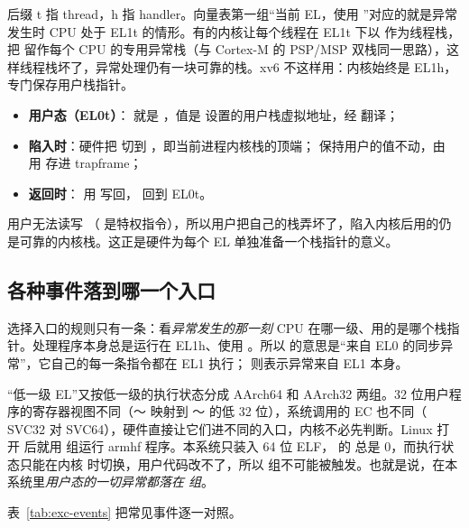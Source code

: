 后缀 t 指 thread，h 指 handler。向量表第一组“当前 EL，使用 ”对应的就是异常发生时 CPU 处于 EL1t 的情形。有的内核让每个线程在 EL1t 下以  作为线程栈，把  留作每个 CPU 的专用异常栈（与 Cortex-M 的 PSP/MSP 双栈同一思路），这样线程栈坏了，异常处理仍有一块可靠的栈。xv6 不这样用：内核始终是 EL1h， 专门保存用户栈指针。

\begin{itemize}
  \item \textbf{用户态（EL0t）}： 就是 ，值是  设置的用户栈虚拟地址，经  翻译；
  \item \textbf{陷入时}：硬件把  切到 ，即当前进程内核栈的顶端； 保持用户的值不动，由  用  存进 trapframe；
  \item \textbf{返回时}： 用  写回， 回到 EL0t。
\end{itemize}

用户无法读写 （ 是特权指令），所以用户把自己的栈弄坏了，陷入内核后用的仍是可靠的内核栈。这正是硬件为每个 EL 单独准备一个栈指针的意义。

\subsection{各种事件落到哪一个入口}
\label{sec:exc-events}

选择入口的规则只有一条：看\emph{异常发生的那一刻} CPU 在哪一级、用的是哪个栈指针。处理程序本身总是运行在 EL1h、使用 。所以  的意思是“来自 EL0 的同步异常”，它自己的每一条指令都在 EL1 执行； 则表示异常来自 EL1 本身。

“低一级 EL”又按低一级的执行状态分成 AArch64 和 AArch32 两组。32 位用户程序的寄存器视图不同（～ 映射到 ～ 的低 32 位），系统调用的 EC 也不同（ SVC32 对  SVC64），硬件直接让它们进不同的入口，内核不必先判断。Linux 打开  后就用  组运行 armhf 程序。本系统只装入 64 位 ELF， 的  总是 0，而执行状态只能在内核  时切换，用户代码改不了，所以  组不可能被触发。也就是说，在本系统里\emph{用户态的一切异常都落在  组}。

表~\ref{tab:exc-events} 把常见事件逐一对照。

